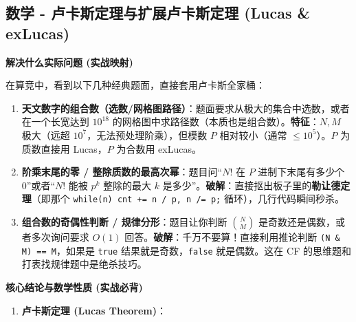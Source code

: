 \documentclass[10pt,landscape,a4paper]{article}
\begin{document}
\begin{multicols*}{3}
\subsection*{数学 - 卢卡斯定理与扩展卢卡斯定理 (Lucas \& exLucas)}
\par\addvspace{0.7ex}\noindent\textbf{解决什么实际问题 (实战映射)}\par\nobreak
在算竞中，看到以下几种经典题面，直接套用卢卡斯全家桶：\par
\begin{enumerate}[start=1]
\item \textbf{天文数字的组合数（选数/网格图路径）}：题面要求从极大的集合中选数，或者在一个长宽达到 $10^{18}$ 的网格图中求路径数（本质也是组合数）。\textbf{特征}：$N, M$ 极大（远超 $10^7$，无法预处理阶乘），但模数 $P$ 相对较小（通常 $\le 10^5$）。$P$ 为质数直接用 Lucas，$P$ 为合数用 exLucas。
\item \textbf{阶乘末尾的零 / 整除质数的最高次幂}：题目问“$N!$ 在 $P$ 进制下末尾有多少个 0”或者“$N!$ 能被 $p^k$ 整除的最大 $k$ 是多少”。\textbf{破解}：直接抠出板子里的\textbf{勒让德定理}（即那个 \texttt{w\allowbreak{}h\allowbreak{}i\allowbreak{}l\allowbreak{}e\allowbreak{}(\allowbreak{}n\allowbreak{})\allowbreak{} \allowbreak{}c\allowbreak{}n\allowbreak{}t\allowbreak{} \allowbreak{}+\allowbreak{}=\allowbreak{} \allowbreak{}n\allowbreak{} \allowbreak{}/\allowbreak{} \allowbreak{}p\allowbreak{},\allowbreak{} \allowbreak{}n\allowbreak{} \allowbreak{}/\allowbreak{}=\allowbreak{} \allowbreak{}p\allowbreak{};} 循环），几行代码瞬间秒杀。
\item \textbf{组合数的奇偶性判断 / 规律分形}：题目让你判断 $\binom{N}{M}$ 是奇数还是偶数，或者多次询问要求 $O(1)$ 回答。\textbf{破解}：千万不要算！直接利用推论判断 \texttt{(\allowbreak{}N\allowbreak{} \allowbreak{}\&\allowbreak{} \allowbreak{}M\allowbreak{})\allowbreak{} \allowbreak{}=\allowbreak{}=\allowbreak{} \allowbreak{}M}，如果是 \texttt{t\allowbreak{}r\allowbreak{}u\allowbreak{}e} 结果就是奇数，\texttt{f\allowbreak{}a\allowbreak{}l\allowbreak{}s\allowbreak{}e} 就是偶数。这在 CF 的思维题和打表找规律题中是绝杀技巧。
\end{enumerate}
\par\addvspace{0.7ex}\noindent\textbf{核心结论与数学性质 (实战必背)}\par\nobreak
\begin{enumerate}[start=1]
\item \textbf{卢卡斯定理 (Lucas Theorem)}：

\end{enumerate}
\end{multicols*}
\end{document}
